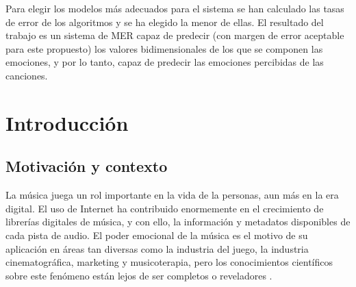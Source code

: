 \documentclass[12pt,a4paper,Spanish]{article}
\newcommand\blankpage{%
	\null
	\thispagestyle{empty}%
	\newpage}
\begin{document}
Para elegir los modelos más adecuados para el sistema se han calculado las tasas de error de los algoritmos y se ha elegido la menor de ellas. El resultado del trabajo es un sistema de MER capaz de predecir (con margen de error aceptable para este propuesto) los valores bidimensionales de los que se componen las emociones, y por lo tanto, capaz de predecir las emociones percibidas de las canciones.








\newpage
\renewcommand*\contentsname{Índice} %
\tableofcontents
\afterpage{\blankpage} %




\newpage
\renewcommand{\listtablename}{Índice de tablas} %
\listoftables %




\newpage
\renewcommand{\listfigurename}{Índice de figuras} %
\listoffigures %






\newpage
\section{Introducción}
\subsection{Motivación y contexto}
La música juega un rol importante en la vida de la personas, aun más en la era digital. El uso de Internet ha contribuido enormemente en el crecimiento de librerías digitales de música, y con ello, la información y metadatos disponibles de cada pista de audio. El poder emocional de la música es el motivo de su aplicación en áreas tan diversas como la industria del juego, la industria cinematográfica, marketing y musicoterapia, pero los conocimientos científicos sobre este fenómeno están lejos de ser completos o reveladores \cite{eerola2012review}.\\
\end{document}
